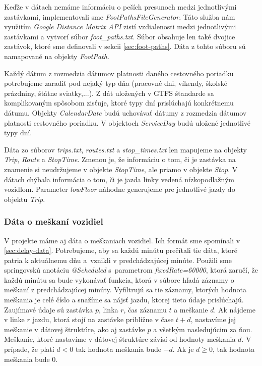 Keďže v dátach nemáme informáciu o peších presunoch medzi jednotlivými zastávkami, implementovali sme \textit{FootPathsFileGenerator}. Táto služba nám využitím \textit{Google Distance Matrix API} zistí vzdialenosti medzi jednotlivými zastávkami a vytvorí súbor \textit{foot\_paths.txt}. Súbor obsahuje len také dvojice zastávok, ktoré sme definovali v sekcii \ref{sec:foot-paths}. Dáta z tohto súboru sú namapované na objekty \textit{FootPath}. 

Každý dátum z rozmedzia dátumov platnosti daného cestovného poriadku potrebujeme zaradiť pod nejaký typ dňa (pracovné dni, víkendy, školské prázdniny, štátne sviatky,...). Z dát uložených v  GTFS štandarde sa komplikovaným spôsobom zisťuje, ktoré typy dní prislúchajú konkrétnemu dátumu. Objekty \textit{CalendarDate} budú uchovávať dátumy z rozmedzia dátumov platnosti cestovného poriadku. V objektoch \textit{ServiceDay} budú uložené jednotlivé typy dní. 

Dáta zo súborov \textit{trips.txt}, \textit{routes.txt} a \textit{stop\_times.txt} len mapujeme na objekty \textit{Trip}, \textit{Route} a \textit{StopTime}. Zmenou je, že informáciu o tom, či je zastávka na znamenie si neudržujeme v objekte \textit{StopTime}, ale priamo v objekte \textit{Stop}. V dátach chýbala informácia o tom, či je jazda linky vedená nízkopodlažným vozidlom. Parameter \textit{lowFloor} náhodne generujeme pre jednotlivé jazdy do objektu \textit{Trip}.

\subsubsection{Dáta o meškaní vozidiel}
V projekte máme aj dáta o meškaniach vozidiel. Ich formát sme spomínali v \ref{sec:delay-data}. Potrebujeme, aby sa každú minútu prečítali tie dáta, ktoré patria k aktuálnemu dňu a~vznikli v predchádzajúcej minúte. Použili sme springovskú anotáciu \textit{@Scheduled} s~parametrom \textit{fixedRate=60000}, ktorá zaručí, že každú minútu sa bude vykonávať funkcia, ktorá v súbore hľadá záznamy o meškaní z predchádzajúcej minúty. Vyfiltrujú sa tie záznamy, ktorých hodnota meškania je celé číslo a snažíme sa nájsť jazdu, ktorej tieto údaje prislúchajú. Zaujímavé údaje sú zastávka $p$, linka $r$, čas záznamu $t$ a meškanie $d$. Ak nájdeme v linke $r$ jazdu, ktorá stojí na zastávke približne v čase $t+d$, nastavíme jej meškanie v dátovej štruktúre, ako aj zastávke $p$ a všetkým  nasledujúcim za ňou. Meškanie, ktoré nastavíme v dátovej štruktúre závisí od hodnoty meškania $d$. V prípade, že platí $d < 0$ tak hodnota meškania bude $-d$. Ak je $d \geq 0$, tak hodnota meškania bude 0. 

